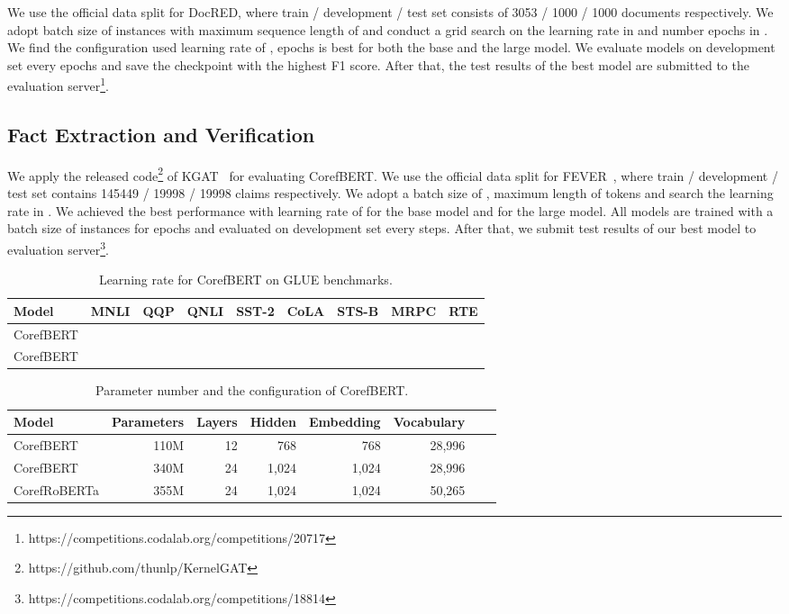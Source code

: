 \documentclass[11pt,a4paper]{article}
\newcommand\BASESIZE{\xspace}
\newcommand\LARGESIZE{\xspace}
\begin{document}
We use the official data split for DocRED, where train / development / test set consists of 3053 / 1000 / 1000 documents respectively.  We adopt batch size of  instances with maximum sequence length of  and conduct a grid search on the learning rate in  and number epochs in . We find the  configuration used learning rate of ,  epochs is best for both the base and the large model. We evaluate models on development set every  epochs and save the checkpoint with the highest F1 score. After that, the test results of the best model are submitted to the evaluation server\footnote{https://competitions.codalab.org/competitions/20717}.


\subsection{Fact Extraction and Verification}

We apply the released code\footnote{https://github.com/thunlp/KernelGAT} of KGAT~\citep{Zhenghao} for evaluating CorefBERT.  We use the official data split for FEVER~\citep{Fever}, where train / development / test set contains 145449 / 19998 / 19998 claims respectively. We adopt a batch size of , maximum length of  tokens and search the learning rate in . We achieved  the best performance  with learning rate of  for the base model and  for the large model. All models are trained with a batch size of  instances for  epochs and evaluated on development set every  steps. After that, we submit test results of our best model to evaluation server\footnote{https://competitions.codalab.org/competitions/18814}. 

\begin{table*}[!t]
\small
\centering
\begin{tabular}{l c c c c c c c c}
\toprule
Model & MNLI & QQP & QNLI & SST-2 & CoLA &  STS-B & MRPC & RTE \\
\midrule
CorefBERT\BASESIZE &  &   & &    &  &  &  &  \\
CorefBERT\LARGESIZE &   &  &  &   &   &  &  & \\
\bottomrule
\end{tabular}
\caption{Learning rate for CorefBERT on GLUE benchmarks.}
\label{gluelr}
\end{table*}

\begin{table*}[!t]
\small
\centering
\begin{tabular}{l r r r r r r r}
\toprule
Model  & Parameters & Layers & Hidden & Embedding & Vocabulary\\
\midrule
CorefBERT\BASESIZE & 110M & 12 & 768& 768&  28,996\\
CorefBERT\LARGESIZE & 340M & 24 & 1,024& 1,024&  28,996\\
CorefRoBERTa\LARGESIZE & 355M & 24 & 1,024& 1,024& 50,265 &\\
\bottomrule
\end{tabular}
\caption{Parameter number and the configuration of CorefBERT.}
\label{number_of_parameters}
\end{table*}
\end{document}
